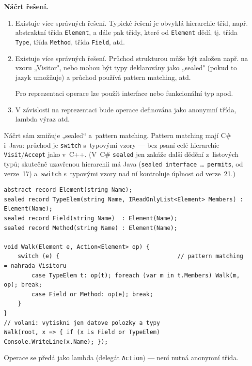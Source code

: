 \medskip
\noindent\textbf{Náčrt řešení.}\par
\begin{enumerate}
\item Existuje více správných řešení. Typické řešení je obvyklá hierarchie tříd, např.
  abstraktní třída \texttt{Element}, a dále pak třídy, které od \texttt{Element} dědí,
  tj. třída \texttt{Type}, třída \texttt{Method}, třída \texttt{Field}, atd.

\item Existuje více správných řešení. Průchod strukturou může být založen např. na vzoru
  „Visitor", nebo mohou být typy deklarovány jako „sealed" (pokud to jazyk umožňuje)
  a průchod používá pattern matching, atd.

  Pro reprezentaci operace lze použít interface nebo funkcionální typ apod.

\item V závislosti na reprezentaci bude operace definována jako anonymní třída, lambda
  výraz atd.
\end{enumerate}

\medskip
\begin{csalt}
Náčrt sám zmiňuje „sealed`` a~pattern matching. Pattern matching mají C\# i~Java: průchod je
\texttt{switch} s~typovými vzory --- bez psaní celé hierarchie \texttt{Visit}/\texttt{Accept} jako v~C++.
(V~C\# \texttt{sealed} jen zakáže další dědění z~listových typů; skutečně uzavřenou hierarchii
má Java (\texttt{sealed interface \dots{} permits}, od verze~17) a~\texttt{switch} s~typovými vzory
nad ní kontroluje úplnost od verze~21.)
\begin{lstlisting}[style=cs]
abstract record Element(string Name);
sealed record TypeElem(string Name, IReadOnlyList<Element> Members) : Element(Name);
sealed record Field(string Name)  : Element(Name);
sealed record Method(string Name) : Element(Name);

void Walk(Element e, Action<Element> op) {
    switch (e) {                                  // pattern matching = nahrada Visitoru
        case TypeElem t: op(t); foreach (var m in t.Members) Walk(m, op); break;
        case Field or Method: op(e); break;
    }
}
// volani: vytiskni jen datove polozky a typy
Walk(root, x => { if (x is Field or TypeElem) Console.WriteLine(x.Name); });
\end{lstlisting}
Operace se předá jako lambda (delegát \texttt{Action}) --- není nutná anonymní třída.
\end{csalt}

